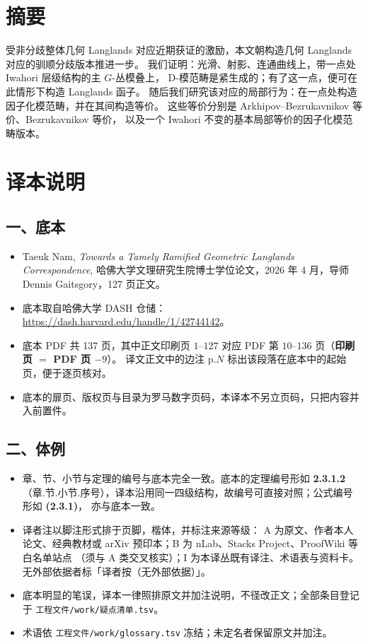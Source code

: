 
\section*{摘要}

受非分歧整体几何 Langlands 对应近期获证的激励，本文朝构造几何 Langlands 对应的驯顺分歧版本推进一步。
我们证明：光滑、射影、连通曲线上，带一点处 Iwahori 层级结构的主 $G$-丛模叠上，
D-模范畴是紧生成的；有了这一点，便可在此情形下构造 Langlands 函子。
随后我们研究该对应的局部行为：在一点处构造因子化模范畴，并在其间构造等价。
这些等价分别是 Arkhipov–Bezrukavnikov 等价、Bezrukavnikov 等价，
以及一个 Iwahori 不变的基本局部等价的因子化模范畴版本。

\section*{译本说明}

\subsection*{一、底本}

\begin{itemize}
\item Taeuk Nam, \emph{Towards a Tamely Ramified Geometric Langlands Correspondence},
哈佛大学文理研究生院博士学位论文，2026 年 4 月，导师 Dennis Gaitsgory，127 页正文。
\item 底本取自哈佛大学 DASH 仓储：\url{https://dash.harvard.edu/handle/1/42744142}。
\item 底本 PDF 共 137 页，其中正文印刷页 $1$–$127$ 对应 PDF 第 $10$–$136$ 页（\textbf{印刷页 $=$ PDF 页 $- 9$}）。
译文正文中的边注 \textsf{p.$N$} 标出该段落在底本中的起始页，便于逐页核对。
\item 底本的扉页、版权页与目录为罗马数字页码，本译本不另立页码，只把内容并入前置件。
\end{itemize}

\subsection*{二、体例}

\begin{itemize}
\item 章、节、小节与定理的编号与底本完全一致。底本的定理编号形如 \textbf{2.3.1.2}
（章.节.小节.序号），译本沿用同一四级结构，故编号可直接对照；公式编号形如 \textbf{(2.3.1)}，
亦与底本一致。
\item 译者注以脚注形式排于页脚，楷体，并标注来源等级：
A 为原文、作者本人论文、经典教材或 arXiv 预印本；B 为 nLab、Stacks Project、ProofWiki 等白名单站点
（须与 A 类交叉核实）；I 为本译丛既有译注、术语表与资料卡。无外部依据者标「译者按（无外部依据）」。
\item 底本明显的笔误，译本一律照排原文并加注说明，不径改正文；全部条目登记于
\texttt{工程文件/work/疑点清单.tsv}。
\item 术语依 \texttt{工程文件/work/glossary.tsv} 冻结；未定名者保留原文并加注。
\end{itemize}

